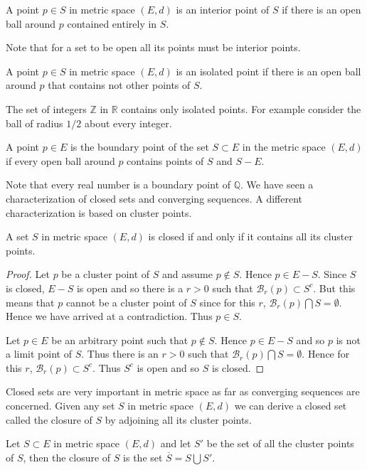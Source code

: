 \begin{Definition}
    A point $p \in S$ in metric space $(E,d)$ is an interior point of $S$ if there is an open ball
    around $p$ contained entirely in $S$.
\end{Definition}
Note that for a set to be open all its points must be interior points.
\begin{Definition}
    A point $p \in S$ in metric space $(E,d)$ is an isolated point if there is an open ball around
    $p$ that contains not other points of $S$.
\end{Definition}
The set of integers $\mathbb{Z}$ in $\mathbb{R}$ contains only isolated points. For example consider
the ball of radius $1/2$ about every integer.
\begin{Definition}
    A point $p \in E$ is the boundary point of the set $S \subset E$ in the metric space $(E,d)$ if
    every open ball around $p$ contains points of $S$ and $S-E$. 
\end{Definition}
Note that every real number is a boundary point of $\mathbb{Q}$. We have seen a characterization of
closed sets and converging sequences. A different characterization is based on cluster points.
\begin{Theorem}
    A set $S$ in metric space $(E,d)$ is closed if and only if it contains all its cluster points.
\end{Theorem}
\begin{proof}
    Let $p$ be a cluster point of $S$ and assume $p \not \in S$. Hence $p \in E - S$. Since $S$ is
    closed, $E-S$ is open and so there is a $r > 0$ such that $\mathcal{B}_r(p) \subset S^c$. But
    this means that $p$ cannot be a cluster point of $S$ since for this $r$, 
    $\mathcal{B}_r(p) \bigcap S = \emptyset$. Hence we have arrived at a contradiction. Thus $p \in
    S$.

    Let $p \in E$ be an arbitrary point such that $p \not \in S$. Hence $p \in E - S$ and so $p$ is
    not a limit point of $S$. Thus there is an $r > 0$ such that $\mathcal{B}_r(p) \bigcap S =
    \emptyset$. Hence for this $r$, $\mathcal{B}_r(p) \subset S^{c}$. Thus $S^c$ is open and so $S$
    is closed.  
\end{proof}
Closed sets are very important in metric space as far as converging sequences are concerned. Given
any set $S$ in metric space $(E,d)$ we can derive a closed set called the closure of $S$ by
adjoining all its cluster points. 
\begin{Definition}
    Let $S \subset E$ in metric space $(E,d)$ and let $S'$ be the set of all the cluster points of
    $S$, then the closure of $S$ is the set $\overline{S} = S \bigcup S'$.
\end{Definition}
